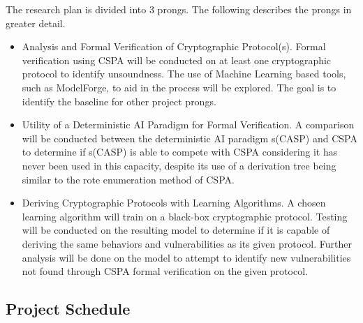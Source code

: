 \documentclass[11pt]{article}
\begin{document}
The research plan is divided into 3 prongs. The following describes the prongs in greater detail. 
\begin{itemize}
    \item Analysis and Formal Verification of Cryptographic Protocol(s). Formal verification using CSPA will be conducted on at least one cryptographic protocol to identify unsoundness. The use of Machine Learning based tools, such as ModelForge, to aid in the process will be explored. The goal is to identify the baseline for other project prongs.
    \item Utility of a Deterministic AI Paradigm for Formal Verification. A comparison will be conducted between the deterministic AI paradigm s(CASP) and CSPA to determine if s(CASP) is able to compete with CSPA considering it has never been used in this capacity, despite its use of a derivation tree being similar to the rote enumeration method of CSPA. 
    \item Deriving Cryptographic Protocols with Learning Algorithms. A chosen learning algorithm will train on a black-box cryptographic protocol. Testing will be conducted on the resulting model to determine if it is capable of deriving the same behaviors and vulnerabilities as its given protocol. Further analysis will be done on the model to attempt to identify new vulnerabilities not found through CSPA formal verification on the given protocol. 
\end{itemize}

\newpage
\subsection{Project Schedule}
\end{document}
